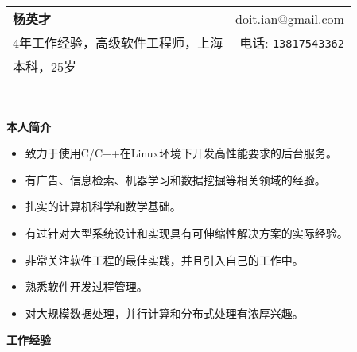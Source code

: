 \documentclass[letterpaper,11pt]{article}
\newcommand{\resheading}[1]{{\large \colorbox{mygrey}{\begin{minipage}{\textwidth}{\textbf{#1 \vphantom{p\^{E}}}}\end{minipage}}}}
\begin{document}

\newcommand{\mywebheader}{
\begin{tabular*}{7in}{l@{\extracolsep{\fill}}r}
	\textbf{\LARGE 杨英才} & \href{mailto:doit.ian@gmail.com}{doit.ian@gmail.com} \\
    {\small 4年工作经验，高级软件工程师，上海} & {\small 电话: \texttt{13817543362}} \\
    {\footnotesize 本科，25岁} & \\
	\end{tabular*}
\\
\vspace{0.1in}}

\mywebheader

\resheading{本人简介}

{ \footnotesize

  \begin{itemize}
  \item 致力于使用C/C++在Linux环境下开发高性能要求的后台服务。
  \item 有广告、信息检索、机器学习和数据挖掘等相关领域的经验。
  \item 扎实的计算机科学和数学基础。
  \item 有过针对大型系统设计和实现具有可伸缩性解决方案的实际经验。
  \item 非常关注软件工程的最佳实践，并且引入自己的工作中。
  \item 熟悉软件开发过程管理。
  \item 对大规模数据处理，并行计算和分布式处理有浓厚兴趣。
  \end{itemize}
}

\resheading{工作经验}
\end{document}
